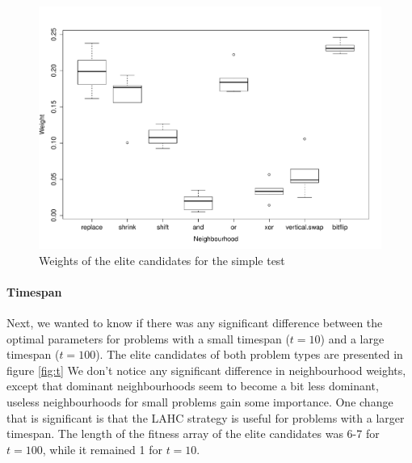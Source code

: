 \documentclass[]{article}
\begin{document}

\begin{figure}
	\includegraphics[width=\textwidth]{boxplot_general.pdf}
	\caption{Weights of the elite candidates for the simple test}
	\label{fig:general}
\end{figure}

\paragraph{Timespan}
Next, we wanted to know if there was any significant difference between the optimal parameters for problems with a small timespan ($t = 10$) and a large timespan ($t=100$). The elite candidates of both problem types are presented in figure \ref{fig:t} We don't notice any significant difference in neighbourhood weights, except that dominant neighbourhoods seem to become a bit less dominant, useless neighbourhoods for small problems gain some importance. One change that is significant is that the LAHC strategy is useful for problems with a larger timespan. The length of the fitness array of the elite candidates was 6-7 for $t = 100$, while it remained 1 for $t = 10$.
\end{document}
